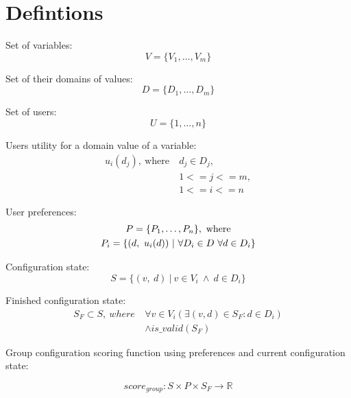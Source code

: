 \documentclass{article}
\begin{document}
\FloatBarrier

\section{Defintions}

Set of variables:
\begin{equation}
    V = \{V_1, \dotsc, V_m\}
\end{equation}

Set of their domains of values:
\begin{equation}
    D = \{D_1, \dotsc, D_m\}
\end{equation}

Set of users:
\begin{equation}
    U = \{1, \dotsc, n\}
\end{equation}

Users utility for a domain value of a variable:
\begin{equation}
    \begin{split}
        u_i(d_j),\ \text{where}\ & d_j \in D_j,\\
        & 1 <= j <= m, \\
        & 1 <= i <= n
    \end{split}
\end{equation}

User preferences:
\begin{gather}
    P = \{ P_1, \dotsc, P_n\},\ \text{where} \\
    P_i = \{(d,\ u_i(d)) \ | \ \forall D_i \in D \ \forall d \in D_i\} \notag
\end{gather}

Configuration state:
\begin{equation}
    S = \{ (v,\ d) \ |\ v \in V_i \ \land \ d \in D_i \}
\end{equation}

Finished configuration state:
\begin{equation}
\begin{split}
    S_F \subset S,\ where \  & \forall v \in V_i (\exists (v, d) \in S_F : d \in D_i) \\
    & \land is\_valid(S_F)
\end{split}
\end{equation}


Group configuration scoring function using preferences and current configuration state:

\begin{equation}
    score_{group}: S \times P \times S_F \to \mathbb{R}
\end{equation}
\end{document}
